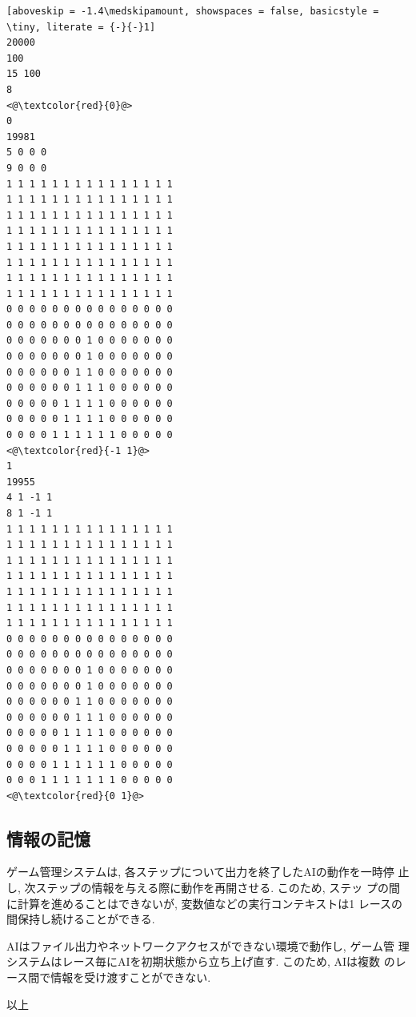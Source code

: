 \documentclass[11pt]{jarticle}
\begin{document}
\begin{minipage}[t]{.3\textwidth}
\begin{lstlisting}[aboveskip = -1.4\medskipamount, showspaces = false, basicstyle = \tiny, literate = {-}{-}1]
20000
100
15 100
8
<@\textcolor{red}{0}@>
0
19981
5 0 0 0
9 0 0 0
1 1 1 1 1 1 1 1 1 1 1 1 1 1 1
1 1 1 1 1 1 1 1 1 1 1 1 1 1 1
1 1 1 1 1 1 1 1 1 1 1 1 1 1 1
1 1 1 1 1 1 1 1 1 1 1 1 1 1 1
1 1 1 1 1 1 1 1 1 1 1 1 1 1 1
1 1 1 1 1 1 1 1 1 1 1 1 1 1 1
1 1 1 1 1 1 1 1 1 1 1 1 1 1 1
1 1 1 1 1 1 1 1 1 1 1 1 1 1 1
0 0 0 0 0 0 0 0 0 0 0 0 0 0 0
0 0 0 0 0 0 0 0 0 0 0 0 0 0 0
0 0 0 0 0 0 0 1 0 0 0 0 0 0 0
0 0 0 0 0 0 0 1 0 0 0 0 0 0 0
0 0 0 0 0 0 1 1 0 0 0 0 0 0 0
0 0 0 0 0 0 1 1 1 0 0 0 0 0 0
0 0 0 0 0 1 1 1 1 0 0 0 0 0 0
0 0 0 0 0 1 1 1 1 0 0 0 0 0 0
0 0 0 0 1 1 1 1 1 1 0 0 0 0 0
<@\textcolor{red}{-1 1}@>
1
19955
4 1 -1 1
8 1 -1 1
1 1 1 1 1 1 1 1 1 1 1 1 1 1 1
1 1 1 1 1 1 1 1 1 1 1 1 1 1 1
1 1 1 1 1 1 1 1 1 1 1 1 1 1 1
1 1 1 1 1 1 1 1 1 1 1 1 1 1 1
1 1 1 1 1 1 1 1 1 1 1 1 1 1 1
1 1 1 1 1 1 1 1 1 1 1 1 1 1 1
1 1 1 1 1 1 1 1 1 1 1 1 1 1 1
0 0 0 0 0 0 0 0 0 0 0 0 0 0 0
0 0 0 0 0 0 0 0 0 0 0 0 0 0 0
0 0 0 0 0 0 0 1 0 0 0 0 0 0 0
0 0 0 0 0 0 0 1 0 0 0 0 0 0 0
0 0 0 0 0 0 1 1 0 0 0 0 0 0 0
0 0 0 0 0 0 1 1 1 0 0 0 0 0 0
0 0 0 0 0 1 1 1 1 0 0 0 0 0 0
0 0 0 0 0 1 1 1 1 0 0 0 0 0 0
0 0 0 0 1 1 1 1 1 1 0 0 0 0 0
0 0 0 1 1 1 1 1 1 1 0 0 0 0 0
<@\textcolor{red}{0 1}@>
\end{lstlisting}
\end{minipage}

\subsection{情報の記憶}
ゲーム管理システムは, 各ステップについて出力を終了したAIの動作を一時停
止し, 次ステップの情報を与える際に動作を再開させる.  このため, ステッ
プの間に計算を進めることはできないが, 変数値などの実行コンテキストは1
レースの間保持し続けることができる.

AIはファイル出力やネットワークアクセスができない環境で動作し, ゲーム管
理システムはレース毎にAIを初期状態から立ち上げ直す. このため, AIは複数
のレース間で情報を受け渡すことができない.

\begin{flushright}
以上
\end{flushright}
\end{document}
